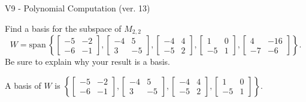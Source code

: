 \begin{exercise}
  \begin{exerciseTitle}V9 - Polynomial Computation (ver. 13)\end{exerciseTitle}
  \begin{exerciseStatement}
    Find a basis for the subspace of \(M_{2,2}\) 
\[W=\mathrm{span}\ \left\{\left[\begin{array}{cc}
-5 & -2 \\
-6 & -1
\end{array}\right] , \left[\begin{array}{cc}
-4 & 5 \\
3 & -5
\end{array}\right] , \left[\begin{array}{cc}
-4 & 4 \\
-5 & 2
\end{array}\right] , \left[\begin{array}{cc}
1 & 0 \\
-5 & 1
\end{array}\right] , \left[\begin{array}{cc}
4 & -16 \\
-7 & -6
\end{array}\right]\right\}.\]
 Be sure to explain why your result is a basis.


  \end{exerciseStatement}
  \begin{exerciseAnswer}
   A basis of \(W\) is  \(\left\{\left[\begin{array}{cc}
-5 & -2 \\
-6 & -1
\end{array}\right] , \left[\begin{array}{cc}
-4 & 5 \\
3 & -5
\end{array}\right] , \left[\begin{array}{cc}
-4 & 4 \\
-5 & 2
\end{array}\right] , \left[\begin{array}{cc}
1 & 0 \\
-5 & 1
\end{array}\right]\right\}\).
  


  \end{exerciseAnswer}
\end{exercise}